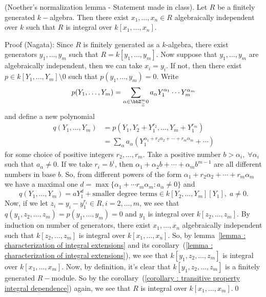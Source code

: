 \begin{dang}
    \begin{lemma}\label{lemma : Noether normalization}
        (Noether's normalization lemma - Statement made in class). Let $R$ be a finitely generated 
        $k-$algebra. Then there exist $x_1,\dots,x_n\in R$ algebraically independent over $k$ such that 
        $R$ is integral over $k[x_1,\dots,x_n]$.
    \end{lemma}
\end{dang}
Proof (Nagata): Since $R$ is finitely generated as a $k$-algebra, there exist generators $y_1,\dots,y_m$ such that 
$R= k[y_1,\dots, y_m]$. Now suppose that $y_1,\dots, y_m$ are algebraically independent, then we can take $x_i = y_i$. 
If not, then there exist $p\in k[Y_1,\dots, Y_m]\setminus0$ such that $p(y_1,\dots,y_m)=0$. Write 
\begin{equation}
    p(Y_1,\dots,Y_m)=\sum_{\alpha\in\bbZ^m_\geq0}a_\alpha Y_1^{\alpha_1}\cdots Y_m^{\alpha_m}
\end{equation}
and define a new polynomial 
\begin{equation}
    \begin{split}
        q(Y_1,\dots,Y_m) &= p(Y_1,Y_2+Y_1^{r_2},\dots, Y_m+Y_1^{r_m})\\
        &=\sum_\alpha a_\alpha(Y_1^{\alpha_1+r_2\alpha_2+\cdots+r_m\alpha_m}+\cdots) 
    \end{split}
\end{equation}
for some choice of positive integers $r_2,\dots,r_m$. Take a positive number $b>\alpha_i,\;\forall \alpha_i$ such that 
$a_\alpha\neq0$. If we take $r_i = b^i$, then $\alpha_1+\alpha_2b+\cdots +\alpha_mb^{m-1}$ are all different numbers in base $b$. 
So, from different powers of the form $\alpha_1+r_2\alpha_2+\cdots+r_m\alpha_m$ we have a maximal one 
$d=\max\{\alpha_1+\cdots r_m\alpha_m:a_\alpha\neq0\}$ and 
\begin{equation}
    q(Y_1,\dots,Y_m) = aY_1^d + \text{smaller degree terms} \in k[Y_2,\dots, Y_m][Y_1],\;a\neq0.
\end{equation}
Now, if we let $z_i=y_i - y_1^{r_i}\in R,i=2,\dots,m$, we see that $q(y_1,z_2,\dots,z_m)=p(y_1,\dots,y_m)=0$ and 
$y_1$ is integral over $k[z_2,\dots, z_m]$. By induction on number of generators, there exist $x_1,\dots, x_n$
algebraically independent such that $k[z_2,\dots, z_m]$ is integral over $k[x_1,\dots, x_n]$. So, by lemma~\ref{lemma : characterization of integral extensions}
and its corollary~(\ref{lemma : characterization of integral extensions}), we see that $k[y_1,z_2,\dots,z_m]$ is integral over $k[x_1,\dots,x_m]$. Now, by definition, it's clear 
that $k[y_1,z_2,\dots,z_m]$ is a finitely generated $R-$module. So by the corollary~(\ref{corollary : transitive property integral dependence}) again, we 
see that $R$ is integral over $k[x_1,\dots,x_m]$.\qed 

